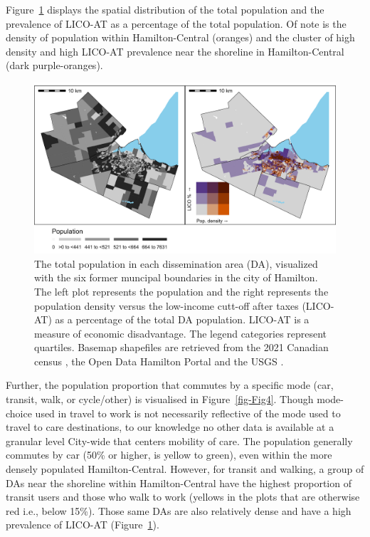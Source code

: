 \documentclass[
  authoryear,
  preprint,
  3p]{elsarticle}
\begin{document}
Figure~\ref{fig-Fig3} displays the spatial distribution of the total
population and the prevalence of LICO-AT as a percentage of the total
population. Of note is the density of population within Hamilton-Central
(oranges) and the cluster of high density and high LICO-AT prevalence
near the shoreline in Hamilton-Central (dark purple-oranges).

\begin{figure}

{\centering \includegraphics[width=6.25in,height=\textheight]{figures/Fig3-plot_pops.png}

}

\caption{\label{fig-Fig3}The total population in each dissemination area
(DA), visualized with the six former muncipal boundaries in the city of
Hamilton. The left plot represents the population and the right
represents the population density versus the low-income cutt-off after
taxes (LICO-AT) as a percentage of the total DA population. LICO-AT is a
measure of economic disadvantage. The legend categories represent
quartiles. Basemap shapefiles are retrieved from the 2021 Canadian
census \citep{governmentofcanadaCensusPopulation2023}, the Open Data
Hamilton Portal \citep{opendatahamiltonCityBoundary2023} and the USGS
\citep{greatlakesUSGS2010}.}

\end{figure}

Further, the population proportion that commutes by a specific mode
(car, transit, walk, or cycle/other) is visualised in
Figure~\ref{fig-Fig4}. Though mode-choice used in travel to work is not
necessarily reflective of the mode used to travel to care destinations,
to our knowledge no other data is available at a granular level
City-wide that centers mobility of care. The population generally
commutes by car (50\% or higher, is yellow to green), even within the
more densely populated Hamilton-Central. However, for transit and
walking, a group of DAs near the shoreline within Hamilton-Central have
the highest proportion of transit users and those who walk to work
(yellows in the plots that are otherwise red i.e., below 15\%). Those
same DAs are also relatively dense and have a high prevalence of LICO-AT
(Figure~\ref{fig-Fig3}).
\end{document}
